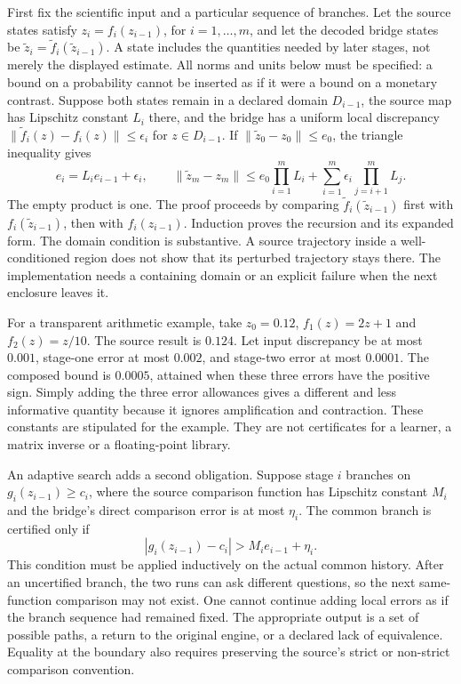 First fix the scientific input and a particular sequence of branches. Let the
source states satisfy $z_i=f_i(z_{i-1})$, for $i=1,\ldots,m$, and let the decoded
bridge states be $\widetilde z_i=\widetilde f_i(\widetilde z_{i-1})$. A state
includes the quantities needed by later stages, not merely the displayed
estimate. All norms and units below must be specified: a bound on a probability
cannot be inserted as if it were a bound on a monetary contrast. Suppose both
states remain in a declared domain $D_{i-1}$, the source map has Lipschitz
constant $L_i$ there, and the bridge has a uniform local discrepancy
$\|\widetilde f_i(z)-f_i(z)\|\leq\epsilon_i$ for $z\in D_{i-1}$.
If $\|\widetilde z_0-z_0\|\leq e_0$, the triangle inequality gives
\begin{equation}
 e_i=L_i e_{i-1}+\epsilon_i,\qquad
 \|\widetilde z_m-z_m\|\leq
 e_0\prod_{i=1}^{m}L_i+
 \sum_{i=1}^{m}\epsilon_i\prod_{j=i+1}^{m}L_j.
 \label{exec17:s9-composed-error}
\end{equation}
The empty product is one. The proof proceeds by comparing
$\widetilde f_i(\widetilde z_{i-1})$ first with
$f_i(\widetilde z_{i-1})$, then with $f_i(z_{i-1})$. Induction proves the
recursion and its expanded form. The domain condition is substantive. A source
trajectory inside a well-conditioned region does not show that its perturbed
trajectory stays there. The implementation needs a containing domain or an
explicit failure when the next enclosure leaves it.

For a transparent arithmetic example, take $z_0=0.12$,
$f_1(z)=2z+1$ and $f_2(z)=z/10$. The source result is $0.124$. Let input
discrepancy be at most $0.001$, stage-one error at most $0.002$, and
stage-two error at most $0.0001$. The composed bound is $0.0005$, attained
when these three errors have the positive sign. Simply adding the three
error allowances gives a different and less informative quantity because it
ignores amplification and contraction. These constants are stipulated for
the example. They are not certificates for a learner, a matrix inverse or
a floating-point library.

An adaptive search adds a second obligation. Suppose stage $i$ branches on
$g_i(z_{i-1})\geq c_i$, where the source comparison function has Lipschitz
constant $M_i$ and the bridge's direct comparison error is at most $\eta_i$.
The common branch is certified only if
\begin{equation}
 |g_i(z_{i-1})-c_i|>M_i e_{i-1}+\eta_i.
 \label{exec17:s9-composed-branch}
\end{equation}
This condition must be applied inductively on the actual common history.
After an uncertified branch, the two runs can ask different questions, so the
next same-function comparison may not exist. One cannot continue adding local
errors as if the branch sequence had remained fixed. The appropriate output is
a set of possible paths, a return to the original engine, or a declared lack
of equivalence. Equality at the boundary also requires preserving the source's
strict or non-strict comparison convention.

